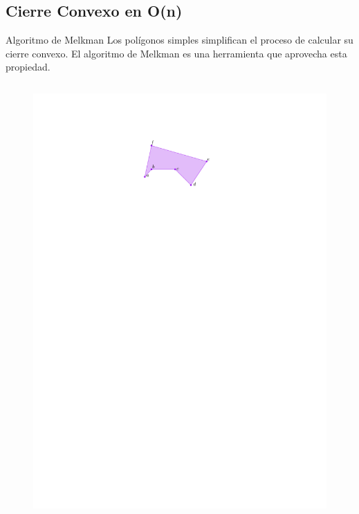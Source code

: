 \documentclass[aspectratio=169,xcolor=dvipsnames, t]{beamer}
\begin{document}
\begin{frame}{}
\begin{columns}
\begin{column}{0.45\textwidth}
\begin{figure}
        \end{figure}
    \end{column}
    \end{columns}
\end{frame}

\subsection{Cierre Convexo en O(n)}
\begin{frame}{Algoritmo de Melkman}
  Los polígonos simples simplifican el proceso de calcular su cierre convexo. El algoritmo de Melkman es una herramienta que aprovecha esta propiedad.
  \begin{columns}
    \begin{column}{0.5\textwidth}
      \begin{figure}
        \centering
        \includegraphics[width=\linewidth, height=0.5\textheight, page=1, keepaspectratio]{IPE/Melkman.pdf}

\end{figure}
\end{column}
\end{columns}
\end{frame}
\end{document}

